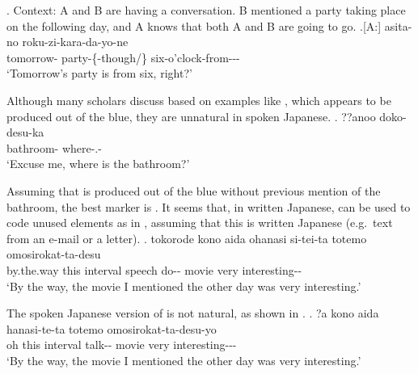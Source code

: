 %
\ex. Context: A and B are having a conversation. B mentioned a party taking place on the following day, and A knows that both A and B are going to go.
	\ag.[A:] asita-no  roku-zi-kara-da-yo-ne \\
		tomorrow- party-\{-though/\} six-o'clock-from--\ab{fp}- \\
		`Tomorrow's party is from six, right?' 


Although many scholars discuss  based on examples like \Next,
which appears to be produced out of the blue,
they are unnatural in spoken Japanese.
%
\exg. ??anoo  doko-desu-ka \\
	 bathroom- where-.- \\
	`Excuse me, where is the bathroom?'

Assuming that \Last is produced out of the blue without previous mention of the bathroom,
the best marker is \ci{\O}.
It seems that, in written Japanese,
 can be used to code unused elements as in \Next,
assuming that this is written Japanese (e.g.\ text from an e-mail or a letter).
%
\exg. tokorode kono aida ohanasi si-tei-ta  totemo omosirokat-ta-desu \\
	by.the.way this interval speech do-- movie
 very interesting-- \\
 `By the way, the movie I mentioned the other day was very interesting.'

The spoken Japanese version of \Last is not natural, as shown in \Next.
%
\exg. ?a kono aida hanasi-te-ta  totemo omosirokat-ta-desu-yo \\
	oh this interval talk-- movie
 very interesting--- \\
 `By the way, the movie I mentioned the other day was very interesting.'

